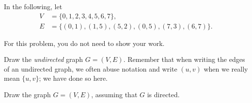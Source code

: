 \begin{prob}
    In the following, let
    \begin{align*}
        V &= \{0,1,2,3,4,5,6,7\},\\
        E &= \{
        (0,1), 
        (1,5), 
        (5,2), 
        (0,5), 
        (7,3),
        (6,7) 
    \}.
    \end{align*}

    For this problem, you do not need to show your work.

    \begin{subprobset}
        \begin{subprob}
            Draw the \emph{undirected} graph $G = (V,E)$. Remember that when
            writing the edges of an undirected graph, we often abuse
            notation and write $(u,v)$ when we really mean $\{u,v\}$; we
            have done so here.

            \begin{soln}

                \begin{center}
                \end{center}

            \end{soln}
        \end{subprob}

        \begin{subprob}
            Draw the graph $G = (V,E)$, assuming that $G$ is directed.

            \begin{soln}

                \begin{center}
                \begin{tikzpicture}[
                    every node/.style={draw, thick, circle, minimum width=2em}
                    ]


\end{tikzpicture}
\end{center}
\end{soln}
\end{subprob}
\end{subprobset}
\end{prob}
